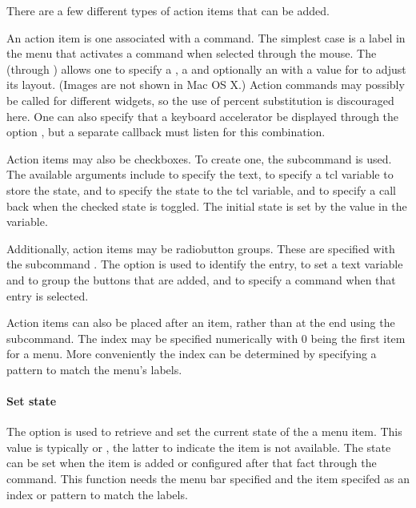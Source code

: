 There are a few different types of action items that can be added.
 

An action item is one associated with a command. The simplest case is
a label in the menu that activates a command when selected through the
mouse. The  (through
) allows one to specify a
, a  and optionally an  with a
value for  to adjust its layout. (Images are not shown
in Mac OS X.) Action commands may possibly be called for different
widgets, so the use of percent substitution is discouraged here. One can also specify that a keyboard accelerator be displayed through the option , but a separate callback must listen for this combination.

Action items may also be checkboxes. To create one, the subcommand
 is used. The available
arguments include  to specify the text,  to
specify a tcl variable to store the state,  and
 to specify the state to the tcl variable, and
 to specify a call back when the checked state is
toggled. The initial state is set by the value in the  \TCL\/ variable.

Additionally, action items may be radiobutton groups. These are
specified with the subcommand . The  option is used to identify
the entry,  to set a text variable and to group the
buttons that are added, and  to specify a command when
that entry is selected.

Action items can also be placed after an item, rather than at the end
using the  subcommand. The
index may be specified numerically with 0 being the first item for a
menu.  More conveniently the index can be determined by specifying a
pattern to match the menu's labels.


\paragraph{Set state}
The  option is used to retrieve and set the current state of the a menu item.
This value is typically  or
, the latter to indicate the item is not available. The
state can be set when the item is added or configured after that fact
through the  command. This function
needs the menu bar specified and the item specifed as an index or
pattern to match the labels.


